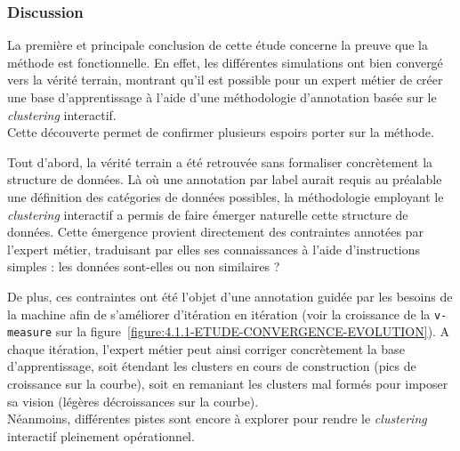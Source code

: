 			\subsubsection{Discussion}
				
				La première et principale conclusion de cette étude concerne la preuve que la méthode est fonctionnelle.
				En effet, les différentes simulations ont bien convergé vers la vérité terrain, montrant qu'il est possible pour un expert métier de créer une base d'apprentissage à l'aide d'une méthodologie d'annotation basée sur le \textit{clustering} interactif. \\
				
				
				Cette découverte permet de confirmer plusieurs espoirs porter sur la méthode. 
				
				Tout d'abord, la vérité terrain a été retrouvée sans formaliser concrètement la structure de données.
				Là où une annotation par label aurait requis au préalable une définition des catégories de données possibles, la méthodologie employant le \textit{clustering} interactif a permis de faire émerger naturelle cette structure de données.
				Cette émergence provient directement des contraintes annotées par l'expert métier, traduisant par elles ses connaissances à l'aide d'instructions simples : les données sont-elles ou non similaires ?
				
				De plus, ces contraintes ont été l'objet d'une annotation guidée par les besoins de la machine afin de s'améliorer d'itération en itération (voir la croissance de la \texttt{v-measure} sur la figure~\ref{figure:4.1.1-ETUDE-CONVERGENCE-EVOLUTION}).
				A chaque itération, l'expert métier peut ainsi corriger concrètement la base d'apprentissage, soit étendant les clusters en cours de construction (pics de croissance sur la courbe), soit en remaniant les clusters mal formés pour imposer sa vision (légères décroissances sur la courbe). \\

				
				Néanmoins, différentes pistes sont encore à explorer pour rendre le \textit{clustering} interactif pleinement opérationnel.
				
